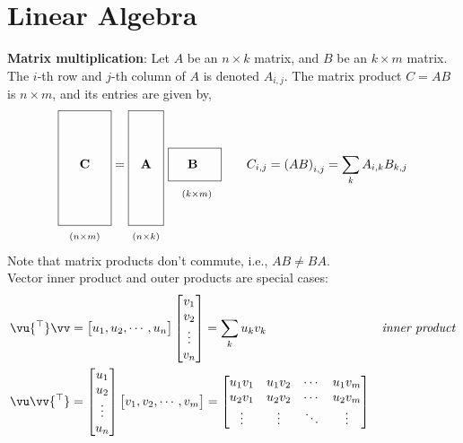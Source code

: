 \documentclass[a4paper,11pt]{exam}
\newcommand*{\clapp}[1]{\hbox to 0pt{\hss#1\hss}}
\newcommand*{\mat}[1]{\boldsymbol{\mathrm{#1}}}
\newcommand*{\subdims}[3]{\clapp{\raisebox{#1}[0pt][0pt]{$\scriptstyle(#2 \times #3)$}}}
\newcounter{ct}
\newcommand{\trp}{{^\top}} %
\begin{document}
\section{Linear Algebra}
\begin{tcolorbox}[colback=black!1!,title=Matrix Fun Facts]
\textbf{Matrix multiplication}:
Let $A$ be an $n \times k$ matrix, and $B$ be an $k \times m$ matrix.
The $i$-th row and $j$-th column of $A$ is denoted $A_{i,j}$.
The matrix product $C = AB$ is $n \times m$, and its entries are given by,
\begin{align}
    \framebox[1.5cm]{\clapp{\raisebox{0pt}[1.5cm][1.5cm]{$\mat C$}}\subdims{-2.0cm} n m} =
    \framebox[1.0cm]{\clapp{\raisebox{0pt}[1.5cm][1.5cm]{$\mat A$}}\subdims{-2.0cm} n k} \ 
    \framebox[1.5cm]{\clapp{\raisebox{0mm}[4.5mm][2.5mm]{$\mat B$}}       \subdims{-8mm} k m}
    \qquad
    C_{i,j} = \left(
    A
    B
    \right)_{i,j}
    =
    \sum_k A_{i,k} B_{k,j}
    \label{eq:matmult}
\end{align}
\\[3mm]
\noindent
Note that matrix products don't commute, i.e., $AB \neq BA$.\\[1mm]
Vector inner product and outer products are special cases:
\begin{align}
    \vu\trp \vv &=
    \begin{bmatrix}
	u_1, u_2, \cdots, u_n
    \end{bmatrix}
    \begin{bmatrix}
	v_1\\v_2\\\vdots\\ v_n
    \end{bmatrix}
    =
    \sum_k u_k v_k
    \,&
    \text{\emph{inner product}}
    \\
    \vu \vv\trp &=
    \begin{bmatrix}
	u_1\\u_2\\\vdots\\ u_n
    \end{bmatrix}
    \begin{bmatrix}
	v_1, v_2, \cdots, v_m
    \end{bmatrix}
    =
    \begin{bmatrix}
	u_1 v_1 & u_1 v_2 & \cdots & u_1 v_m
	\\
	u_2 v_1 & u_2 v_2 & \cdots & u_2 v_m
	\\
	\vdots & \vdots & \ddots & \vdots
	\\

\end{bmatrix}
\end{align}
\end{tcolorbox}
\end{document}
